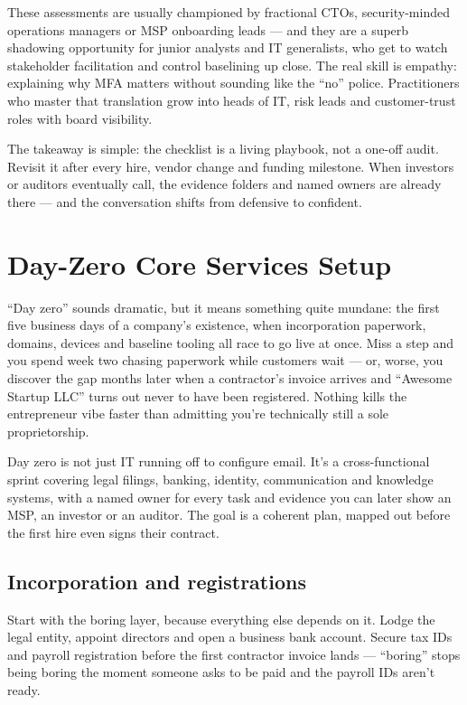 These assessments are usually championed by fractional CTOs, security-minded operations managers or MSP onboarding leads — and they are a superb shadowing opportunity for junior analysts and IT generalists, who get to watch stakeholder facilitation and control baselining up close. The real skill is empathy: explaining why MFA matters without sounding like the ``no'' police. Practitioners who master that translation grow into heads of IT, risk leads and customer-trust roles with board visibility.


The takeaway is simple: the checklist is a living playbook, not a one-off audit. Revisit it after every hire, vendor change and funding milestone. When investors or auditors eventually call, the evidence folders and named owners are already there — and the conversation shifts from defensive to confident.

\section{Day-Zero Core Services Setup}
``Day zero'' sounds dramatic, but it means something quite mundane: the first five business days of a company's existence, when incorporation paperwork, domains, devices and baseline tooling all race to go live at once. Miss a step and you spend week two chasing paperwork while customers wait — or, worse, you discover the gap months later when a contractor's invoice arrives and ``Awesome Startup LLC'' turns out never to have been registered. Nothing kills the entrepreneur vibe faster than admitting you're technically still a sole proprietorship.


Day zero is not just IT running off to configure email. It's a cross-functional sprint covering legal filings, banking, identity, communication and knowledge systems, with a named owner for every task and evidence you can later show an MSP, an investor or an auditor. The goal is a coherent plan, mapped out before the first hire even signs their contract.



\subsection{Incorporation and registrations}


Start with the boring layer, because everything else depends on it. Lodge the legal entity, appoint directors and open a business bank account. Secure tax IDs and payroll registration before the first contractor invoice lands — ``boring'' stops being boring the moment someone asks to be paid and the payroll IDs aren't ready.


